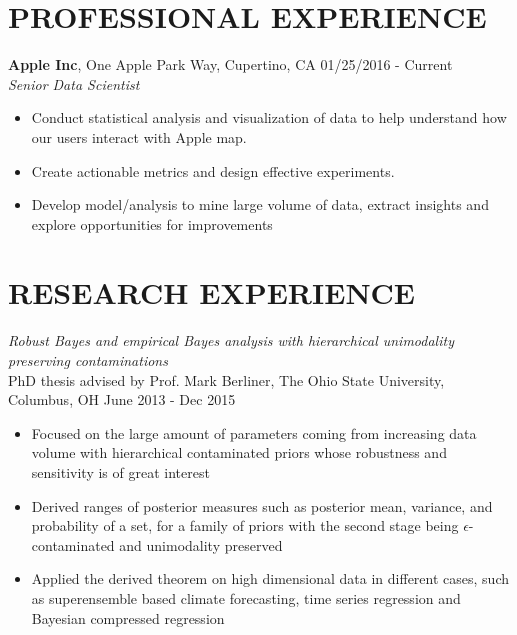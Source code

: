 \documentclass[10pt]{res} %
\begin{document}
\begin{resume}
\section{PROFESSIONAL EXPERIENCE}
\vspace{6pt} %
{\bf Apple Inc}, One Apple Park Way, Cupertino, CA \hfill 01/25/2016 - Current\\
 {\sl Senior Data Scientist}
 \begin{itemize} \itemsep -2pt
\item Conduct statistical analysis and visualization of data to help understand how our users interact with Apple map.
\item Create actionable metrics and design effective experiments.
\item Develop model/analysis to mine large volume of data, extract insights and explore opportunities for improvements
 \end{itemize}




\section{RESEARCH EXPERIENCE}

\vspace{6pt} %

  {\sl Robust Bayes and empirical Bayes analysis with
     hierarchical unimodality preserving contaminations }\\
PhD thesis advised by Prof. Mark Berliner, The Ohio State University,
Columbus, OH \hfill June 2013 - Dec 2015
 \begin{itemize} \itemsep -2pt  %
    \item Focused on the large amount of parameters coming from
      increasing data volume with hierarchical contaminated priors whose robustness and sensitivity is of great interest
    \item Derived ranges of posterior measures such as posterior mean,
      variance, and probability of a set, for a family of priors with the second stage being $\epsilon$-contaminated and unimodality preserved
    \item Applied the derived theorem on high dimensional data in different cases, such as superensemble based climate forecasting, time series regression and Bayesian compressed regression
\end{itemize}


\end{resume}
\end{document}

